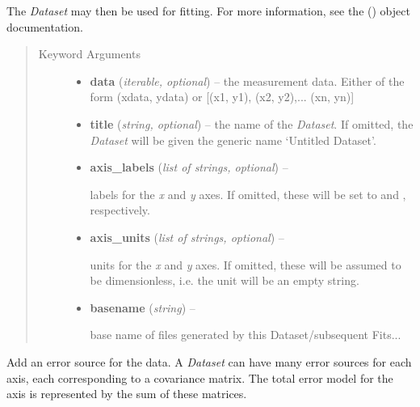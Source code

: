 \documentclass[a4paper,10pt,english]{sphinxmanual}
\begin{document}
\begin{fulllineitems}
The \emph{Dataset} may then be used for fitting. For more information, see the
{\hyperref[index:kafe.fit.Fit]{\emph{}}} () object documentation.
\begin{quote}\begin{description}
\item[{Keyword Arguments}] \leavevmode\begin{itemize}
\item {} 
\textbf{data} (\emph{iterable, optional}) --
the measurement data. Either of the form (xdata, ydata) or
{[}(x1, y1), (x2, y2),... (xn, yn){]}

\item {} 
\textbf{title} (\emph{string, optional}) --
the name of the \emph{Dataset}. If omitted, the \emph{Dataset} will be given the
generic name `Untitled Dataset'.

\item {} 
\textbf{axis\_labels} (\emph{list of strings, optional}) --

labels for the \emph{x} and \emph{y} axes. If omitted, these will be set to
 and , respectively.

\item {} 
\textbf{axis\_units} (\emph{list of strings, optional}) --

units for the \emph{x} and \emph{y} axes. If omitted, these will be assumed to be
dimensionless, i.e. the unit will be an empty string.

\item {} 
\textbf{basename} (\emph{string}) --

base name of files generated by this Dataset/subsequent Fits...

\end{itemize}

\end{description}\end{quote}

\begin{fulllineitems}
\label{index:kafe.dataset.Dataset.add_error_source}
Add an error source for the data. A \emph{Dataset} can have many
error sources for each axis, each corresponding to a covariance matrix.
The total error model for the axis is represented by the sum of
these matrices.


\end{fulllineitems}
\end{fulllineitems}
\end{document}
